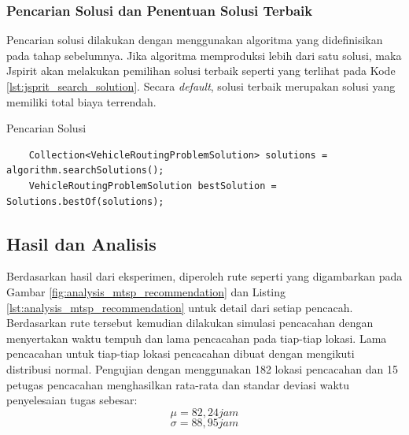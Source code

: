 \subsubsection{Pencarian Solusi dan Penentuan Solusi Terbaik}
Pencarian solusi dilakukan dengan menggunakan algoritma yang didefinisikan pada tahap sebelumnya. Jika algoritma memproduksi lebih dari satu solusi, maka Jspirit akan melakukan pemilihan solusi terbaik seperti yang terlihat pada Kode \ref{lst:jsprit_search_solution}. Secara \textit{default}, solusi terbaik merupakan solusi yang memiliki total biaya terrendah.


\begin{listing}[!]
	\captionsetup{format=hang}
	\caption{Pencarian Solusi}
	\label{lst:jsprit_search_solution}
	\begin{verbatim}
	Collection<VehicleRoutingProblemSolution> solutions = algorithm.searchSolutions();
	VehicleRoutingProblemSolution bestSolution = Solutions.bestOf(solutions);
	\end{verbatim}
\end{listing}


\subsection{Hasil dan Analisis}
\label{ssec:hasil-analisis}
Berdasarkan hasil dari eksperimen, diperoleh rute seperti yang digambarkan pada Gambar \ref{fig:analysis_mtsp_recommendation} dan Listing \ref{lst:analysis_mtsp_recommendation} untuk detail dari setiap pencacah. Berdasarkan rute tersebut kemudian dilakukan simulasi pencacahan dengan menyertakan waktu tempuh dan lama pencacahan pada tiap-tiap lokasi. Lama pencacahan untuk tiap-tiap lokasi pencacahan dibuat dengan mengikuti distribusi normal. Pengujian dengan menggunakan 182 lokasi pencacahan dan 15 petugas pencacahan menghasilkan rata-rata dan standar deviasi waktu penyelesaian tugas sebesar:  
$$ \mu = 82,24 jam $$
$$ \sigma = 88,95 jam $$


